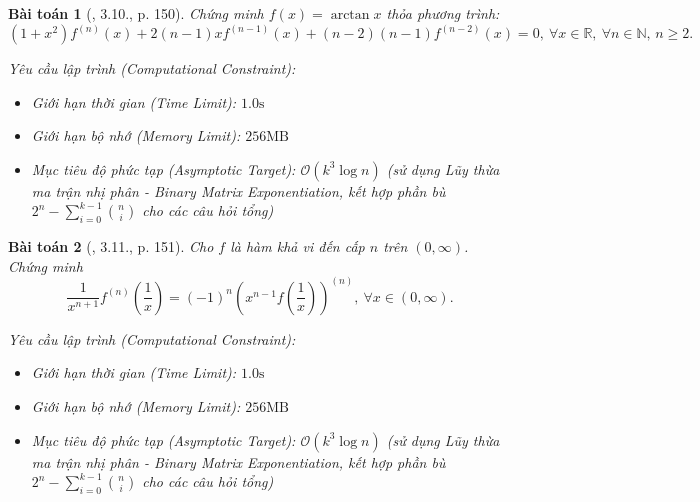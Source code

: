 \documentclass{article}
\newtheorem{baitoan}{Bài toán}
\begin{document}
\begin{baitoan}[\cite{Quoc_Long_Dat_Nam_VMC}, 3.10., p. 150]
	Chứng minh $f(x) = \arctan x$ thỏa phương trình:
	\begin{equation*}
		(1 + x^2)f^{(n)}(x) + 2(n - 1)xf^{(n-1)}(x) + (n - 2)(n - 1)f^{(n-2)}(x) = 0,\ \forall x\in\mathbb{R},\ \forall n\in\mathbb{N},\,n\ge2.
	\end{equation*}

    \vspace{0.5em}
    \emph{Yêu cầu lập trình (Computational Constraint):}
    \begin{itemize}
        \item Giới hạn thời gian (Time Limit): $1.0\mathrm{s}$
        \item Giới hạn bộ nhớ (Memory Limit): $256\mathrm{MB}$
        \item Mục tiêu độ phức tạp (Asymptotic Target): $\mathcal{O}(k^3 \log n)$ (sử dụng Lũy thừa ma trận nhị phân - Binary Matrix Exponentiation, kết hợp phần bù $2^n - \sum_{i=0}^{k-1} \binom{n}{i}$ cho các câu hỏi tổng)
    \end{itemize}
\end{baitoan}


\begin{baitoan}[\cite{Quoc_Long_Dat_Nam_VMC}, 3.11., p. 151]
	Cho $f$ là hàm khả vi đến cấp $n$ trên $(0,\infty)$. Chứng minh
	\begin{equation*}
		\frac{1}{x^{n+1}}f^{(n)}\left(\frac{1}{x}\right) = (-1)^n\left(x^{n-1}f\left(\frac{1}{x}\right)\right)^{(n)},\ \forall x\in(0,\infty).
	\end{equation*}

    \vspace{0.5em}
    \emph{Yêu cầu lập trình (Computational Constraint):}
    \begin{itemize}
        \item Giới hạn thời gian (Time Limit): $1.0\mathrm{s}$
        \item Giới hạn bộ nhớ (Memory Limit): $256\mathrm{MB}$
        \item Mục tiêu độ phức tạp (Asymptotic Target): $\mathcal{O}(k^3 \log n)$ (sử dụng Lũy thừa ma trận nhị phân - Binary Matrix Exponentiation, kết hợp phần bù $2^n - \sum_{i=0}^{k-1} \binom{n}{i}$ cho các câu hỏi tổng)
    \end{itemize}
\end{baitoan}
\end{document}
